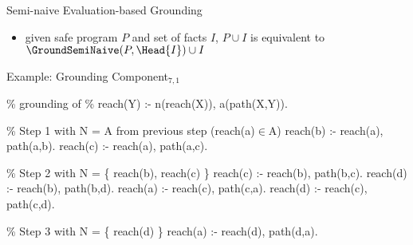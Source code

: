 \begin{frame}{Semi-naive Evaluation-based Grounding}
  \vfill
  \begin{itemize}
    \item given safe program \(P\) and set of facts \(I\), \(P \cup I\) is equivalent to \(\GroundSemiNaive(P,\Head{I}) \cup I\)
  \end{itemize}
\end{frame}

\begin{frame}[fragile]{Example: Grounding Component\(_{7,1}\)}
\vfill
\begin{SemiVerbatim}[\small]{.9}
{\color{comment}\% grounding of
\% reach(Y) :- {n(reach(X))}, a(path(X,Y)).}

{\color{comment}\% Step 1 with N = A from previous step (reach(a)\({}\in{}\)A)}
\alert{reach(b)} :- \alert{reach(a)}\only<1>{)}, path(a,b).
\alert{reach(c)} :- \alert{reach(a)}, path(a,c).

{\color{comment}\% Step 2 with N = \{ reach(b), reach(c) \}}
reach(c) :- \alert{reach(b)}\only<1>{)}, path(b,c).
\alert{reach(d)} :- \alert{reach(b)}, path(b,d).
reach(a) :- \alert{reach(c)}, path(c,a).
\alert{reach(d)} :- \alert{reach(c)}, path(c,d).

{\color{comment}\% Step 3 with N = \{ reach(d) \}}
reach(a) :- \alert{reach(d)}\only<1>{)}, path(d,a).

\end{SemiVerbatim}
\end{frame}

